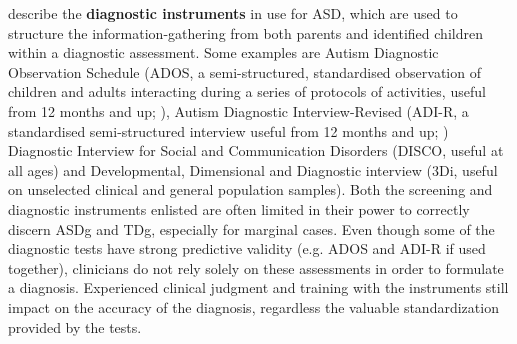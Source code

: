 \cite{charman2013measuerement} describe the \textbf{diagnostic instruments} in use for ASD, which are used to structure the information-gathering from both parents and identified children within a diagnostic assessment. Some examples are Autism Diagnostic Observation Schedule (ADOS, a semi-structured, standardised observation of children and adults interacting during a series of protocols of activities, useful from 12 months and up; \citealp{lord2000ADOS}), Autism Diagnostic Interview-Revised (ADI-R, a standardised semi-structured interview useful from 12 months and up; \citealp{rutter2003ADI-R}) Diagnostic Interview for Social and Communication Disorders (DISCO, useful at all ages) and Developmental, Dimensional and Diagnostic interview (3Di, useful on unselected clinical and general population samples).
Both the screening and diagnostic instruments enlisted are often limited in their power to correctly discern ASDg and TDg, especially for marginal cases. Even though some of the diagnostic tests have strong predictive validity (e.g. ADOS and ADI-R if used together), clinicians do not rely solely on these assessments in order to formulate a diagnosis. Experienced clinical judgment and training with the instruments still impact on the accuracy of the diagnosis, regardless the valuable standardization provided by the tests. 



